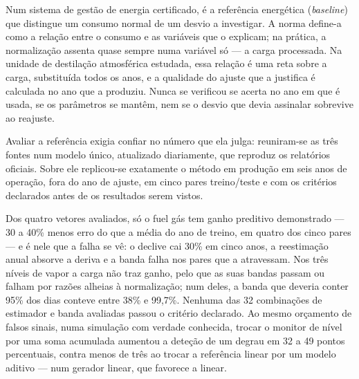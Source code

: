 
Num sistema de gestão de energia certificado, é a referência energética (\emph{baseline}) que distingue um consumo normal de um desvio a investigar. A norma define-a como a relação entre o consumo e as variáveis que o explicam; na prática, a normalização assenta quase sempre numa variável só --- a carga processada. Na unidade de destilação atmosférica estudada, essa relação é uma reta sobre a carga, substituída todos os anos, e a qualidade do ajuste que a justifica é calculada no ano que a produziu. Nunca se verificou se acerta no ano em que é usada, se os parâmetros se mantêm, nem se o desvio que devia assinalar sobrevive ao reajuste.

Avaliar a referência exigia confiar no número que ela julga: reuniram-se as três fontes num modelo único, atualizado diariamente, que reproduz os relatórios oficiais. Sobre ele replicou-se exatamente o método em produção em seis anos de operação, fora do ano de ajuste, em cinco pares treino/teste e com os critérios declarados antes de os resultados serem vistos.

Dos quatro vetores avaliados, só o fuel gás tem ganho preditivo demonstrado --- 30 a 40\% menos erro do que a média do ano de treino, em quatro dos cinco pares --- e é nele que a falha se vê: o declive cai 30\% em cinco anos, a reestimação anual absorve a deriva e a banda falha nos pares que a atravessam. Nos três níveis de vapor a carga não traz ganho, pelo que as suas bandas passam ou falham por razões alheias à normalização; num deles, a banda que deveria conter 95\% dos dias conteve entre 38\% e 99,7\%. Nenhuma das 32 combinações de estimador e banda avaliadas passou o critério declarado. Ao mesmo orçamento de falsos sinais, numa simulação com verdade conhecida, trocar o monitor de nível por uma soma acumulada aumentou a deteção de um degrau em 32 a 49 pontos percentuais, contra menos de três ao trocar a referência linear por um modelo aditivo --- num gerador linear, que favorece a linear.

